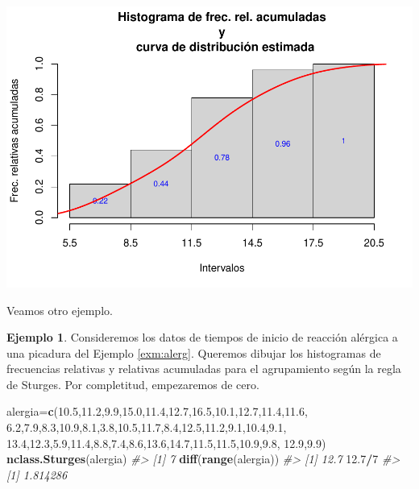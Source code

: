 \documentclass[
]{book}
\newenvironment{Shaded}{\begin{snugshade}}{\end{snugshade}}
\newcommand{\CommentTok}[1]{\textcolor[rgb]{0.56,0.35,0.01}{\textit{#1}}}
\newcommand{\DecValTok}[1]{\textcolor[rgb]{0.00,0.00,0.81}{#1}}
\newcommand{\FloatTok}[1]{\textcolor[rgb]{0.00,0.00,0.81}{#1}}
\newcommand{\KeywordTok}[1]{\textcolor[rgb]{0.13,0.29,0.53}{\textbf{#1}}}
\newcommand{\NormalTok}[1]{#1}
\newcommand{\OperatorTok}[1]{\textcolor[rgb]{0.81,0.36,0.00}{\textbf{#1}}}
\theoremstyle{definition}
\theoremstyle{definition}
\newtheorem{example}{Ejemplo}[chapter]
\theoremstyle{definition}
\theoremstyle{remark}
\begin{document}
\begin{center}\includegraphics[width=0.9\linewidth]{13chap13_Agrupados_files/figure-latex/unnamed-chunk-84-1} \end{center}

Veamos otro ejemplo.

\begin{example}
\protect\hypertarget{exm:unnamed-chunk-85}{}{\label{exm:unnamed-chunk-85} }Consideremos los datos de tiempos de inicio de reacción alérgica a una picadura del Ejemplo \ref{exm:alerg}. Queremos dibujar los histogramas de frecuencias relativas y relativas acumuladas para el agrupamiento según la regla de Sturges. Por completitud, empezaremos de cero.
\end{example}

\begin{Shaded}
\begin{Highlighting}[]
\NormalTok{alergia=}\KeywordTok{c}\NormalTok{(}\FloatTok{10.5}\NormalTok{,}\FloatTok{11.2}\NormalTok{,}\FloatTok{9.9}\NormalTok{,}\FloatTok{15.0}\NormalTok{,}\FloatTok{11.4}\NormalTok{,}\FloatTok{12.7}\NormalTok{,}\FloatTok{16.5}\NormalTok{,}\FloatTok{10.1}\NormalTok{,}\FloatTok{12.7}\NormalTok{,}\FloatTok{11.4}\NormalTok{,}\FloatTok{11.6}\NormalTok{,}
  \FloatTok{6.2}\NormalTok{,}\FloatTok{7.9}\NormalTok{,}\FloatTok{8.3}\NormalTok{,}\FloatTok{10.9}\NormalTok{,}\FloatTok{8.1}\NormalTok{,}\FloatTok{3.8}\NormalTok{,}\FloatTok{10.5}\NormalTok{,}\FloatTok{11.7}\NormalTok{,}\FloatTok{8.4}\NormalTok{,}\FloatTok{12.5}\NormalTok{,}\FloatTok{11.2}\NormalTok{,}\FloatTok{9.1}\NormalTok{,}\FloatTok{10.4}\NormalTok{,}\FloatTok{9.1}\NormalTok{,}
  \FloatTok{13.4}\NormalTok{,}\FloatTok{12.3}\NormalTok{,}\FloatTok{5.9}\NormalTok{,}\FloatTok{11.4}\NormalTok{,}\FloatTok{8.8}\NormalTok{,}\FloatTok{7.4}\NormalTok{,}\FloatTok{8.6}\NormalTok{,}\FloatTok{13.6}\NormalTok{,}\FloatTok{14.7}\NormalTok{,}\FloatTok{11.5}\NormalTok{,}\FloatTok{11.5}\NormalTok{,}\FloatTok{10.9}\NormalTok{,}\FloatTok{9.8}\NormalTok{,}
  \FloatTok{12.9}\NormalTok{,}\FloatTok{9.9}\NormalTok{)}
\KeywordTok{nclass.Sturges}\NormalTok{(alergia)}
\CommentTok{\#\textgreater{} [1] 7}
\KeywordTok{diff}\NormalTok{(}\KeywordTok{range}\NormalTok{(alergia))}
\CommentTok{\#\textgreater{} [1] 12.7}
\FloatTok{12.7}\OperatorTok{/}\DecValTok{7}
\CommentTok{\#\textgreater{} [1] 1.814286}
\end{Highlighting}
\end{Shaded}
\end{document}
